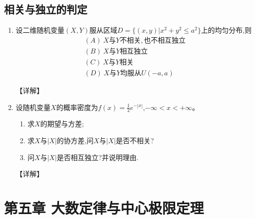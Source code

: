 \documentclass[12pt, a4paper, oneside, UTF8]{ctexbook}
\begin{document}
\subsection{相关与独立的判定}

\begin{enumerate}[label=\arabic*.,start=15]
    \item  设二维随机变量$(X,Y)$服从区域$D=\{(x,y)|x^2+y^2\leq a^2\}$上的均匀分布,则
    \begin{align*}
        (A)\ X与Y不相关,也不相互独立 \\
        (B)\ X与Y相互独立 \\
        (C)\ X与Y相关 \\
        (D)\ X与Y均服从U(-a,a)
    \end{align*}
    
    \begin{solution}
    【详解】
    \end{solution}
    
    \item  设随机变量$X$的概率密度为$f(x)=\frac{1}{2}e^{-|x|}$,$-\infty<x<+\infty$。
    \begin{enumerate}
        \item 求$X$的期望与方差;
        \item 求$X$与$|X|$的协方差,问$X$与$|X|$是否不相关?
        \item 问$X$与$|X|$是否相互独立?并说明理由.
    \end{enumerate}
    
    \begin{solution}
    【详解】
    \end{solution}
\end{enumerate}

\section{第五章 大数定律与中心极限定理}
\end{document}
